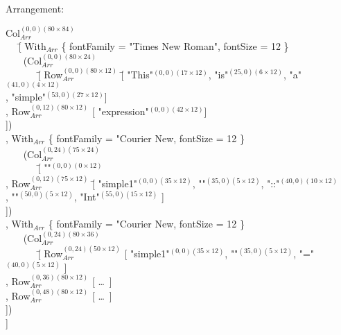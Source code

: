 Arrangement:
\small \ttfamily
\begin{tabbing}
Col$_{Arr}^{(0,0)(80\times84)}$ \\
~~ \= [ With$_{Arr}$ \{ fontFamily = "Times New Roman", fontSize = 12 \}\\
      \> ~~~ (Col$_{Arr}^{(0,0)(80\times24)}$ \\
      \> ~~~~~~ \= [ Row$_{Arr}^{(0,0)(80\times12)}$ \= [ "This"$^{(0,0)(17\times12)}$, "is"$^{(25,0)(6\times12)}$, "a"$^{(41,0)(4\times12)}$ \\
      \>       \>                                                      \>, "simple"$^{(53,0)(27\times12)}$]\\
      \>       \> , Row$_{Arr}^{(0,12)(80\times12)}$  [ "expression"$^{(0,0)(42\times12)}$]\\
      \>       \> ])\\
                    
      \> , With$_{Arr}$ \{ fontFamily = "Courier New,  fontSize = 12 \}\\
      \> ~~~ (Col$_{Arr}^{(0,24)(75\times24)}$\\
      \> ~~~~~~ \= [ ""$^{(0,0)(0\times12)}$\\
      \>      \> , Row$_{Arr}^{(0,12)(75\times12)}$ \= [ "simple1"$^{(0,0)(35\times12)}$, "\textvisiblespace"$^{(35,0)(5\times12)}$, "::"$^{(40,0)(10\times12)}$\\
      \>      \>                                                      \> , "\textvisiblespace"$^{(50,0)(5\times12)}$, "Int"$^{(55,0)(15\times12)}$ ]\\

      \>      \>  ])\\
                    
      \> , With$_{Arr}$ \{ fontFamily = "Courier New,  fontSize = 12 \}\\
      \> ~~~ (Col$_{Arr}^{(0,24)(80\times36)}$\\
      \> ~~~~~~ \= [  Row$_{Arr}^{(0,24)(50\times12)}$ [ "simple1"$^{(0,0)(35\times12)}$, "\textvisiblespace"$^{(35,0)(5\times12)}$, "="$^{(40,0)(5\times12)}$ ]\\
      \>      \> , Row$_{Arr}^{(0,36)(80\times12)}$ [ \dots~]\\
      \>      \> , Row$_{Arr}^{(0,48)(80\times12)}$ [ \dots~]\\
      \>      \> ])\\
       \> ]


\end{tabbing}
